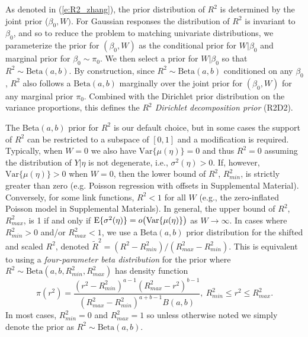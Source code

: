 \documentclass[12pt]{article}
\begin{document}
As denoted in (\ref{e:R2_zhang}), the prior distribution of $R^2$ is determined by the joint prior ($\beta_0,W)$.  For Gaussian responses the distribution of $R^2$ is invariant to $\beta_0$, and so to reduce the problem to matching univariate distributions, we parameterize the prior for $(\beta_0,W)$ as the conditional prior for $W|\beta_0$ and marginal prior for $\beta_0\sim\pi_0$.  We then select a prior for $W|\beta_0$ so that $R^2\sim\mbox{Beta}(a,b)$.  By construction, since $R^2\sim\mbox{Beta}(a,b)$ conditioned on any $\beta_0$, $R^2$ also follows a $\mbox{Beta}(a,b)$ marginally over the joint prior for $(\beta_0,W)$ for any marginal prior $\pi_0$. Combined with the Dirichlet prior distribution on the variance proportions, this defines the {\it $R^2$ Dirichlet decomposition prior} (R2D2).


The Beta$(a,b)$ prior for $R^2$ is our default choice, but in some cases the support of $R^2$ can be restricted to a subspace of $[0,1]$ and a modification is required. Typically, when $W=0$ we also have $\mbox{Var}\{\mu(\eta)\}=0$ and thus $R^2=0$ assuming the distribution of $Y|\eta$ is not degenerate, i.e., $\sigma^2(\eta)>0$. If, however, $\mbox{Var}\{\mu(\eta)\}>0$ when $W=0$, then the lower bound of $R^2$, $R^2_{min}$, is strictly greater than zero (e.g. Poisson regression with offsets in Supplemental Material).  Conversely, for some link functions, $R^2<1$ for all $W$ (e.g., the zero-inflated Poisson model in Supplemental Materials). In general, the upper bound of $R^2$, $R^2_{max}$, is
1 if and only if
$
    \mbox{E}\{\sigma^2(\eta)\}
    =o\big(\mbox{Var}\{\mu(\eta)\}\big)
$
as $W\to\infty$. In cases where $R^2_{min}>0$ and/or $R^2_{max}<1$, we use a Beta$(a,b)$ prior distribution for the shifted and scaled $R^2$, denoted ${\tilde R}^2=(R^2-R^2_{min})/(R^2_{max}-R^2_{min})$. This is equivalent to using a {\it four-parameter beta distribution} for the prior where $R^2\sim\mbox{Beta}(a,b,R^2_{min},R^2_{max})$ has density function
$$
  \pi(r^2)
  =\frac{(r^2-R^2_{min})^{a-1}(R^2_{max}-r^2)^{b-1}}{(R^2_{max}-R^2_{min})^{a+b-1}B(a,b)},\ R^2_{min}\leq r^2\leq R^2_{max}.
$$
In most cases, $R^2_{min}=0$ and $R^2_{max}=1$ so unless otherwise noted we simply denote the prior as $R^2\sim\mbox{Beta}(a,b)$.
\end{document}
